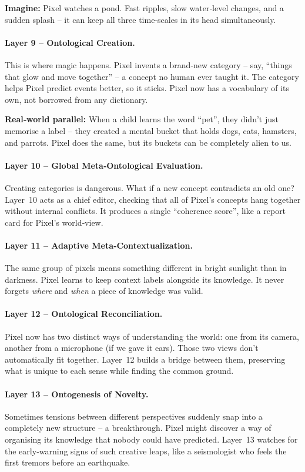 \textbf{Imagine:} Pixel watches a pond.  Fast ripples, slow water‑level
changes, and a sudden splash – it can keep all three time‑scales in
its head simultaneously.

\paragraph{Layer 9 – Ontological Creation.}
This is where magic happens.  Pixel invents a brand‑new category –
say, “things that glow and move together” – a concept no human ever
taught it.  The category helps Pixel predict events better, so it
sticks.  Pixel now has a vocabulary of its own, not borrowed from
any dictionary.

\textbf{Real‑world parallel:} When a child learns the word “pet”, they
didn’t just memorise a label – they created a mental bucket that holds
dogs, cats, hamsters, and parrots.  Pixel does the same, but its
buckets can be completely alien to us.

\paragraph{Layer 10 – Global Meta‑Ontological Evaluation.}
Creating categories is dangerous.  What if a new concept contradicts
an old one?  Layer~10 acts as a chief editor, checking that all of
Pixel’s concepts hang together without internal conflicts.  It
produces a single “coherence score”, like a report card for Pixel’s
world‑view.

\paragraph{Layer 11 – Adaptive Meta‑Contextualization.}
The same group of pixels means something different in bright sunlight
than in darkness.  Pixel learns to keep context labels alongside its
knowledge.  It never forgets \emph{where} and \emph{when} a piece of
knowledge was valid.

\paragraph{Layer 12 – Ontological Reconciliation.}
Pixel now has two distinct ways of understanding the world: one from
its camera, another from a microphone (if we gave it ears).  Those two
views don’t automatically fit together.  Layer~12 builds a bridge
between them, preserving what is unique to each sense while finding
the common ground.

\paragraph{Layer 13 – Ontogenesis of Novelty.}
Sometimes tensions between different perspectives suddenly snap into
a completely new structure – a breakthrough.  Pixel might discover
a way of organising its knowledge that nobody could have predicted.
Layer~13 watches for the early‑warning signs of such creative leaps,
like a seismologist who feels the first tremors before an earthquake.

